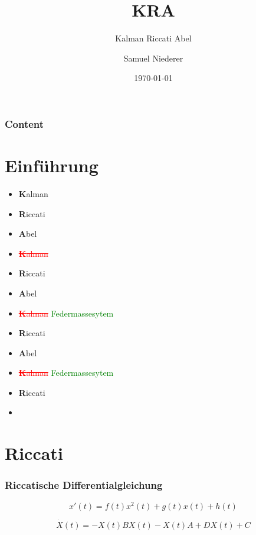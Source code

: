 \documentclass[ngerman, aspectratio=169, xcolor={rgb}]{beamer}
\title{KRA}
\subtitle{Kalman Riccati Abel}
\author{Samuel Niederer}
\date{\today}
\begin{document}
\begin{frame}
	\titlepage
\end{frame}

\begin{frame}
	\frametitle{Content}
	\tableofcontents
\end{frame}

\section{Einführung}

\begin{frame}
	\begin{itemize}
		\item<1|only@1> \textbf{K}alman
		\item<1|only@1> \textbf{R}iccati
		\item<1|only@1> \textbf{A}bel

		\item<2|only@2> \textcolor{red}{\sout{\textbf{K}alman}}
		\item<2|only@2> \textbf{R}iccati
		\item<2|only@2> \textbf{A}bel

		\item<3|only@3> \textcolor{red}{\sout{\textbf{K}alman}} \textcolor{green}{Federmassesytem}
		\item<3|only@3> \textbf{R}iccati
		\item<3|only@3> \textbf{A}bel

		\item<4|only@4> \textcolor{red}{\sout{\textbf{K}alman}} \textcolor{green}{Federmassesytem}
		\item<4|only@4> \textbf{R}iccati
		\item<4|only@4> 
	\end{itemize}
\end{frame}

\section{Riccati}

\begin{frame}
	\frametitle{Riccatische Differentialgleichung}
	\begin{equation*}
		x'(t) = f(t)x^2(t) + g(t)x(t) + h(t)
	\end{equation*}

	\pause

	\begin{equation*}
		\dot{X}(t) = - X(t)BX(t) - X(t)A + DX(t) + C
	\end{equation*}

\end{frame}
\end{document}
